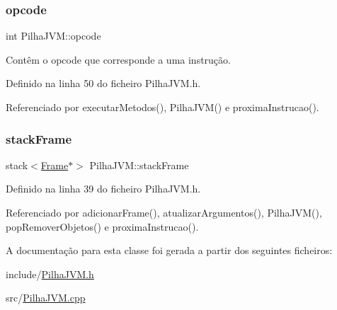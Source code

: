 \subsubsection{\texorpdfstring{opcode}{opcode}}
{\footnotesize\ttfamily int Pilha\+J\+V\+M\+::opcode\hspace{0.3cm}{\ttfamily [private]}}



Contêm o opcode que corresponde a uma instrução. 



Definido na linha 50 do ficheiro Pilha\+J\+V\+M.\+h.



Referenciado por executar\+Metodos(), Pilha\+J\+V\+M() e proxima\+Instrucao().

\mbox{\label{classPilhaJVM_a4d70c8b3d6fbddb38e943dc8b1a00c2d}} 
\subsubsection{\texorpdfstring{stack\+Frame}{stackFrame}}
{\footnotesize\ttfamily stack$<$\hyperlink{PilhaJVM_8h_acc380914b41a084dcc8e4b38fb200145}{Frame}$\ast$$>$ Pilha\+J\+V\+M\+::stack\+Frame\hspace{0.3cm}{\ttfamily [private]}}



Definido na linha 39 do ficheiro Pilha\+J\+V\+M.\+h.



Referenciado por adicionar\+Frame(), atualizar\+Argumentos(), Pilha\+J\+V\+M(), pop\+Remover\+Objetos() e proxima\+Instrucao().



A documentação para esta classe foi gerada a partir dos seguintes ficheiros\+:\begin{DoxyCompactItemize}
\item 
include/\hyperlink{PilhaJVM_8h}{Pilha\+J\+V\+M.\+h}\item 
src/\hyperlink{PilhaJVM_8cpp}{Pilha\+J\+V\+M.\+cpp}\end{DoxyCompactItemize}
